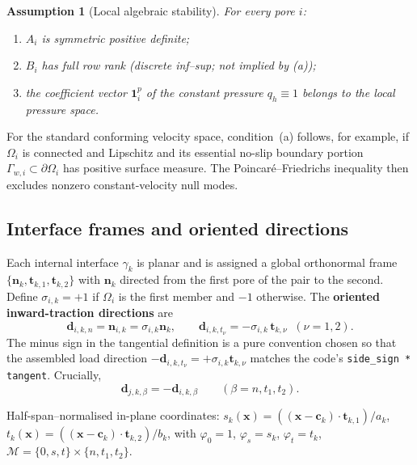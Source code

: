 \documentclass[11pt,a4paper]{article}
\newtheorem{assumption}{Assumption}[section]
\newcommand{\pore}[1]{\Omega_{#1}}
\newcommand{\iface}{\gamma}
\newcommand{\normal}{\bm{n}}
\newcommand{\one}{\mathbf{1}}
\newcommand{\modeset}{\mathcal{M}}
\begin{document}
\begin{assumption}[Local algebraic stability]\label{ass:stability}
  For every pore $i$:
  \begin{enumerate}[label=(\alph*),nosep,leftmargin=*]
    \item $A_i$ is symmetric positive definite;
    \item $B_i$ has full row rank (discrete inf--sup; not implied by (a));
    \item the coefficient vector $\one_i^p$ of the constant pressure
      $q_h \equiv 1$ belongs to the local pressure space.
  \end{enumerate}
\end{assumption}

For the standard conforming velocity space, condition~(a) follows, for
example, if $\pore{i}$ is connected and Lipschitz and its essential
no-slip boundary portion $\Gamma_{w,i}\subset\partial\pore{i}$ has
positive surface measure.  The Poincar\'e--Friedrichs inequality then
excludes nonzero constant-velocity null modes.

\subsection{Interface frames and oriented directions}

Each internal interface $\iface_k$ is planar and is assigned a global
orthonormal frame $\{\normal_k,\bm{t}_{k,1},\bm{t}_{k,2}\}$ with
$\normal_k$ directed from the first pore of the pair to the second.
Define $\sigma_{i,k}=+1$ if $\pore{i}$ is the first member and $-1$
otherwise.  The \textbf{oriented inward-traction directions} are
\begin{equation}\label{eq:dir}
  \bm{d}_{i,k,n} = \normal_{i,k} = \sigma_{i,k}\normal_k,\qquad
  \bm{d}_{i,k,t_\nu} = -\sigma_{i,k}\,\bm{t}_{k,\nu}\;\;(\nu=1,2).
\end{equation}
The minus sign in the tangential definition is a pure convention
chosen so that the assembled load direction
$-\bm{d}_{i,k,t_\nu} = +\sigma_{i,k}\bm{t}_{k,\nu}$
matches the code's \texttt{side\_sign * tangent}.  Crucially,
\begin{equation}\label{eq:opposite}
  \bm{d}_{j,k,\beta} = -\bm{d}_{i,k,\beta}
  \qquad (\beta = n,t_1,t_2).
\end{equation}

Half-span--normalised in-plane coordinates:
$s_k(\bm{x}) = ((\bm{x}-\bm{c}_k)\cdot\bm{t}_{k,1})/a_k$,
$t_k(\bm{x}) = ((\bm{x}-\bm{c}_k)\cdot\bm{t}_{k,2})/b_k$,
with $\varphi_0=1$, $\varphi_s=s_k$, $\varphi_t=t_k$,
$\modeset = \{0,s,t\}\times\{n,t_1,t_2\}$.
\end{document}
